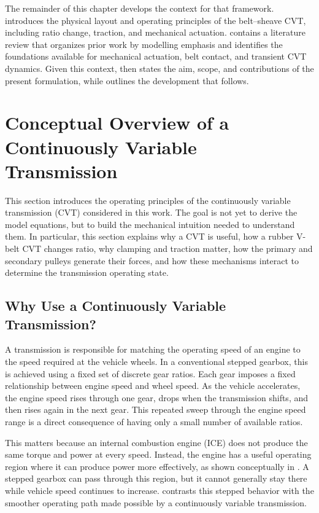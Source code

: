 \documentclass[11pt]{report}
\numberwithin{equation}{section}
\begin{document}
The remainder of this chapter develops the context for that framework.
 introduces the physical layout and operating principles
of the belt--sheave CVT, including ratio change, traction, and mechanical
actuation.  contains a literature review that
organizes prior work by modelling emphasis and identifies the foundations
available for mechanical actuation, belt contact, and transient CVT dynamics.
Given this context,  then states the aim,
scope, and contributions of the present formulation, while
 outlines the development that follows.


\section{Conceptual Overview of a Continuously Variable Transmission}
\label{sec:cvt_overview}

This section introduces the operating principles of the continuously variable
transmission (CVT) considered in this work. The goal is not yet to derive the
model equations, but to build the mechanical intuition needed to understand
them. In particular, this section explains why a CVT is useful, how a rubber
V-belt CVT changes ratio, why clamping and traction matter, how the primary
and secondary pulleys generate their forces, and how these mechanisms interact
to determine the transmission operating state.

\subsection{Why Use a Continuously Variable Transmission?}
\label{subsec:why_use_cvt}

A transmission is responsible for matching the operating speed of an engine to
the speed required at the vehicle wheels. In a conventional stepped gearbox,
this is achieved using a fixed set of discrete gear ratios. Each gear imposes a
fixed relationship between engine speed and wheel speed. As the vehicle
accelerates, the engine speed rises through one gear, drops when the
transmission shifts, and then rises again in the next gear. This repeated sweep
through the engine speed range is a direct consequence of having only a small
number of available ratios.

This matters because an internal combustion engine (ICE) does not produce the
same torque and power at every speed. Instead, the engine has a useful operating
region where it can produce power more effectively, as shown conceptually in
. A stepped gearbox can pass through this
region, but it cannot generally stay there while vehicle speed continues to
increase.  contrasts this stepped
behavior with the smoother operating path made possible by a continuously
variable transmission.
\end{document}

